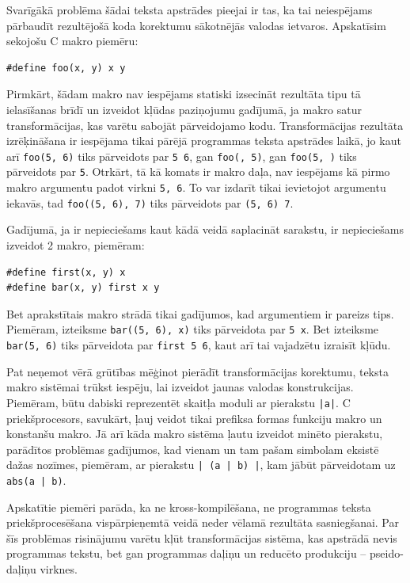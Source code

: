 Svarīgākā problēma šādai teksta apstrādes pieejai ir tas, ka tai neiespējams pārbaudīt rezultējošā koda korektumu sākotnējās valodas ietvaros. Apskatīsim sekojošu C makro piemēru:
\begin{verbatim}
#define foo(x, y) x y
\end{verbatim}

Pirmkārt, šādam makro nav iespējams statiski izsecināt rezultāta tipu tā ielasīšanas brīdī un izveidot kļūdas paziņojumu gadījumā, ja makro satur transformācijas, kas varētu sabojāt pārveidojamo kodu. Transformācijas rezultāta izrēķināšana ir iespējama tikai pārējā programmas teksta apstrādes laikā, jo kaut arī \verb|foo(5, 6)| tiks pārveidots par \verb|5 6|, gan \verb|foo(, 5)|, gan \verb|foo(5, )| tiks pārveidots par \verb|5|. Otrkārt, tā kā komats ir makro daļa, nav iespējams kā pirmo makro argumentu padot virkni \verb|5, 6|. To var izdarīt tikai ievietojot argumentu iekavās, tad \verb|foo((5, 6), 7)| tiks pārveidots par \verb|(5, 6) 7|.

Gadījumā, ja ir nepieciešams kaut kādā veidā saplacināt sarakstu, ir nepieciešams izveidot 2 makro, piemēram:
\begin{verbatim}
#define first(x, y) x
#define bar(x, y) first x y
\end{verbatim}

Bet aprakstītais makro strādā tikai gadījumos, kad argumentiem ir pareizs tips. Piemēram, izteiksme \verb|bar((5, 6), x)| tiks pārveidota par \verb|5 x|. Bet izteiksme \verb|bar(5, 6)| tiks pārveidota par \verb|first 5 6|, kaut arī tai vajadzētu izraisīt kļūdu. 


Pat neņemot vērā grūtības mēģinot pierādīt transformācijas korektumu, teksta makro sistēmai trūkst iespēju, lai izveidot jaunas valodas konstrukcijas. Piemēram, būtu dabiski reprezentēt skaitļa moduli ar pierakstu \verb/|a|/. C priekšprocesors, savukārt, ļauj veidot tikai prefiksa formas funkciju makro un konstanšu makro. Jā arī kāda makro sistēma ļautu izveidot minēto pierakstu, parādītos problēmas gadījumos, kad vienam un tam pašam simbolam eksistē dažas nozīmes, piemēram, ar pierakstu \verb/| (a | b) |/, kam jābūt pārveidotam uz \verb/abs(a | b)/.

Apskatītie piemēri parāda, ka ne kross-kompilēšana, ne programmas teksta priekšprocesēšana vispārpieņemtā veidā neder vēlamā rezultāta sasniegšanai. Par šīs problēmas risinājumu varētu kļūt transformācijas sistēma, kas apstrādā nevis programmas tekstu, bet gan programmas daļiņu un reducēto produkciju -- pseido-daļiņu virknes. 

